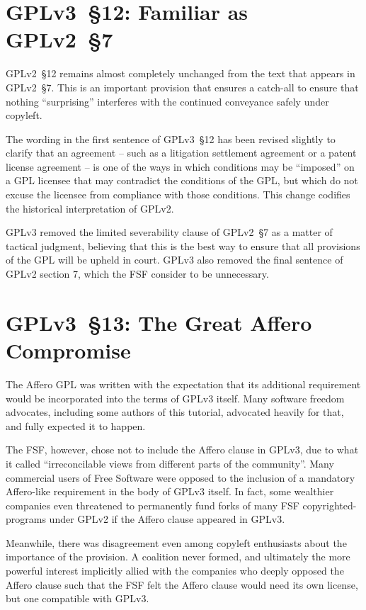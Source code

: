 \section{GPLv3~\S12: Familiar as GPLv2~\S7}
\label{GPLv3s12}

GPLv2~\S12 remains almost completely unchanged from the text that appears in
GPLv2~\S7.  This is an important provision that ensures a catch-all to ensure
that nothing ``surprising'' interferes with the continued conveyance safely
under copyleft.

The wording in the first sentence of GPLv3~\S12 has been revised slightly to
clarify that an agreement -- such as a litigation settlement agreement or a
patent license agreement -- is one of the ways in which conditions may be
``imposed'' on a GPL licensee that may contradict the conditions of the GPL,
but which do not excuse the licensee from compliance with those conditions.
This change codifies the historical interpretation of GPLv2.

GPLv3 removed the limited severability clause of GPLv2~\S7 as a
matter of tactical judgment, believing that this is the best way to ensure
that all provisions of the GPL will be upheld in court. GPLv3 also removed
the final sentence of GPLv2 section 7, which the FSF consider to be unnecessary.

\section{GPLv3~\S13: The Great Affero Compromise}

The Affero GPL was written with the expectation that its
additional requirement would be incorporated into the terms of GPLv3
itself.  Many software freedom advocates, including some authors of this
tutorial, advocated heavily for that, and fully expected it to happen.

The FSF, however, chose not to include the Affero clause in GPLv3, due to
what it called  ``irreconcilable views from
different parts of the community''.  Many
commercial users of Free Software were opposed to the inclusion of a
mandatory Affero-like requirement in the body of GPLv3 itself.  In fact, some
wealthier companies even threatened to permanently fund forks of many FSF
copyrighted-programs under GPLv2 if the Affero clause appeared in GPLv3.

Meanwhile, there was disagreement even among copyleft enthusiasts about the
importance of the provision.  A coalition never formed, and ultimately the
more powerful interest implicitly allied with the companies who deeply opposed
the Affero clause such that the FSF felt the Affero clause would need its own
license, but one compatible with GPLv3. 


